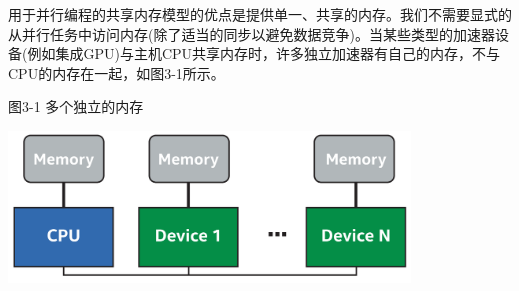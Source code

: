 用于并行编程的共享内存模型的优点是提供单一、共享的内存。我们不需要显式的从并行任务中访问内存(除了适当的同步以避免数据竞争)。当某些类型的加速器设备(例如集成GPU)与主机CPU共享内存时，许多独立加速器有自己的内存，不与CPU的内存在一起，如图3-1所示。\par

\hspace*{\fill} \par %
图3-1 多个独立的内存
\begin{center}
	\includegraphics[width=0.8\textwidth]{content/chapter-3/images/2}
\end{center}









